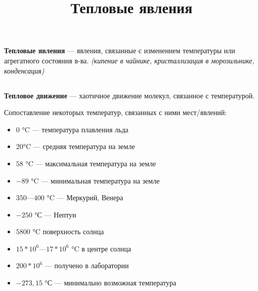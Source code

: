 \documentclass{article}
\title{Тепловые явления}
\date{}
\author{}
\begin{document}
\section*{}
\textbf{Тепловые явления}
— явления, связанные с изменением температуры или агрегатного состояния в-ва. 
\textit{(кипение в чайнике, кристаллизация в морозильнике, конденсация)} 
\subsection*{}
  \textbf{Тепловое движение} — хаотичное движение молекул, связанное с температурой.\par
Сопоставление некоторых температур, связанных с ними мест/явлений:
\begin{itemize}
\item \(0\) °C — температура плавления льда
\item \(20\)°C — средняя температура на земле
\item \(58\) °C — максимальная температура на земле
\item \(-89\) °C — минимальная температура на земле
\item \(350 — 400\) °C — Меркурий, Венера
\item \(-250\) °С — Нептун
\item \(5800\) °C поверхность солнца
\item \(15*10^6 — 17*10^6\) °C в центре солнца
\item \(200*10^6\) — получено в лаборатории
\item \(-273,15\) °С — минимально возможная температура
\end{itemize}
\end{document}
